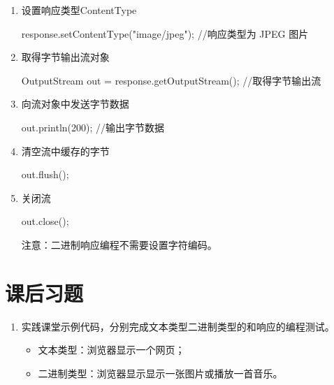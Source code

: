\begin{enumerate}
\item 设置响应类型ContentType
  \begin{javaCode}
    response.setContentType("image/jpeg"); //响应类型为 JPEG 图片
  \end{javaCode}

\item 取得字节输出流对象
  \begin{javaCode}
    OutputStream out = response.getOutputStream(); //取得字节输出流
  \end{javaCode}

\item 向流对象中发送字节数据
  \begin{javaCode}
    out.println(200); //输出字节数据
  \end{javaCode}

\item 清空流中缓存的字节
  \begin{javaCode}
    out.flush();
  \end{javaCode}

\item 关闭流
  \begin{javaCode}
    out.close();
  \end{javaCode}

  {\Red\kai 注意：二进制响应编程不需要设置字符编码。}
\end{enumerate}

\section{课后习题}


\begin{enumerate}
\item 实践课堂示例代码，分别完成文本类型二进制类型的和响应的编程测试。
  \begin{itemize}
  \item 文本类型：浏览器显示一个网页；
  \item 二进制类型：浏览器显示显示一张图片或播放一首音乐。      
  \end{itemize}
\end{enumerate}